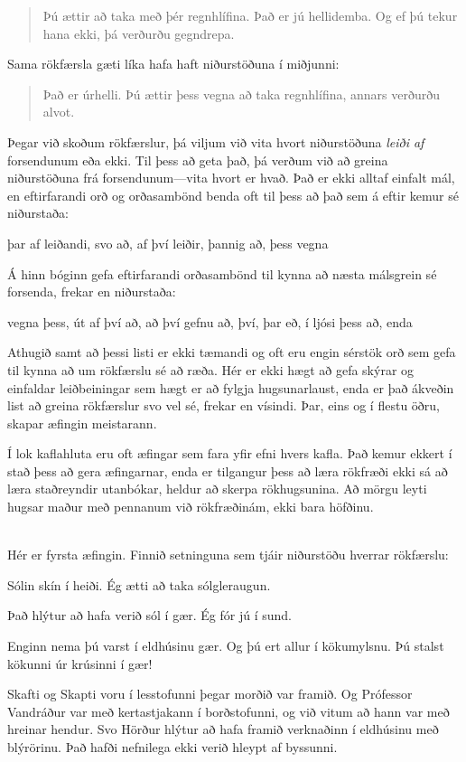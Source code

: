 	\begin{quote}
		Þú ættir að taka með þér regnhlífina. Það er jú hellidemba. Og ef þú tekur hana ekki, þá verðurðu gegndrepa. 
	\end{quote}
Sama rökfærsla gæti líka hafa haft niðurstöðuna í miðjunni:
	\begin{quote}
		Það er úrhelli. Þú ættir þess vegna að taka regnhlífina, annars verðurðu alvot.
	\end{quote}
Þegar við skoðum rökfærslur, þá viljum við vita hvort niðurstöðuna \emph{leiði af} forsendunum eða ekki. Til þess að geta það, þá verðum við að greina niðurstöðuna frá forsendunum---vita hvort er hvað. Það er ekki alltaf einfalt mál, en eftirfarandi orð og orðasambönd benda oft til þess að það sem á eftir kemur sé niðurstaða:	
	\begin{center}
		þar af leiðandi, svo að, af því leiðir, þannig að, þess vegna 
	\end{center}
Á hinn bóginn gefa eftirfarandi orðasambönd til kynna að næsta málsgrein sé forsenda, frekar en niðurstaða: 
	\begin{center}
		vegna þess, út af því að, að því gefnu að, því, þar eð, í ljósi þess að, enda		
	\end{center}
	
Athugið samt að þessi listi er ekki tæmandi og oft eru engin sérstök orð sem gefa til kynna að um rökfærslu sé að ræða. Hér er ekki hægt að gefa skýrar og einfaldar leiðbeiningar sem hægt er að fylgja hugsunarlaust, enda er það ákveðin list að greina rökfærslur svo vel sé, frekar en vísindi. Þar, eins og í flestu öðru, skapar æfingin meistarann.	

\practiceproblems

Í lok kaflahluta eru oft æfingar sem fara yfir efni hvers kafla. Það kemur ekkert í stað þess að gera æfingarnar, enda er tilgangur þess að læra rökfræði ekki sá að læra staðreyndir utanbókar, heldur að skerpa rökhugsunina. Að mörgu leyti hugsar maður með pennanum við rökfræðinám, ekki bara höfðinu.

\
\\Hér er fyrsta æfingin. Finnið setninguna sem tjáir niðurstöðu hverrar rökfærslu:

\begin{earg}
	\item Sólin skín í heiði. Ég ætti að taka sólgleraugun.
	\item Það hlýtur að hafa verið sól í gær. Ég fór jú í sund.
	\item Enginn nema þú varst í eldhúsinu gær. Og þú ert allur í kökumylsnu. Þú stalst kökunni úr krúsinni í gær!
	\item Skafti og Skapti voru í lesstofunni þegar morðið var framið. Og Prófessor Vandráður var með kertastjakann í borðstofunni, og við vitum að hann var með hreinar hendur. Svo Hörður hlýtur að hafa framið verknaðinn í eldhúsinu með blýrörinu. Það hafði nefnilega ekki verið hleypt af byssunni.
\end{earg}


